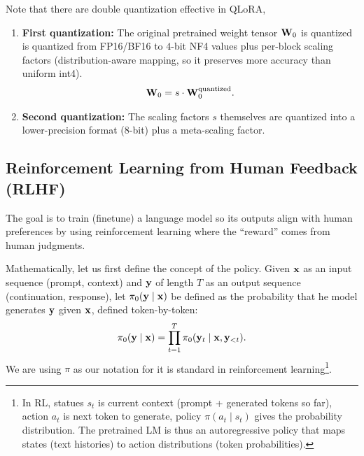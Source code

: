\documentclass[11pt]{article}  %
\begin{document}
Note that there are double quantization effective in QLoRA, 
\begin{enumerate}
  \item \textbf{First quantization:} The original pretrained weight tensor $\mathbf{W}_0$ is quantized is quantized from FP16/BF16 to $4$-bit NF4 values plus per-block scaling factors (distribution-aware mapping, so it preserves more accuracy than uniform int4).
  \begin{align*}
    \mathbf{W}_0 = s \cdot \mathbf{W}_0^{\text{quantized}}. 
  \end{align*}
  
  \item \textbf{Second quantization:} The scaling factors $s$ themselves are quantized into a lower-precision format (8-bit) plus a meta-scaling factor.
\end{enumerate}



\subsection{Reinforcement Learning from Human Feedback (RLHF)}
The goal is to train (finetune) a language model so its outputs align with human preferences by using reinforcement learning where the “reward” comes from human judgments.

Mathematically, let us first define the concept of the policy.
Given $\mathbf{x}$ as an input sequence (prompt, context) and $\mathbf{y}$ of length $T$ as an output sequence (continuation, response), let $\pi_0(\mathbf{y} \mid \mathbf{x})$ be defined as the probability that he model generates $\mathbf{y}$ given $\mathbf{x}$, defined token-by-token:
\begin{align*}
  \pi_0(\mathbf{y} \mid \mathbf{x}) = \prod_{t=1}^T \pi_0(\mathbf{y}_t \mid \mathbf{x}, \mathbf{y}_{<t}).
\end{align*}
We are using $\pi$ as our notation for it is standard in reinforcement learning\footnote{In RL, statues $s_t$ is current context (prompt + generated tokens so far), action $a_t$ is next token to generate, policy $\pi(a_t \mid s_t)$ gives the probability distribution. The pretrained LM is thus an autoregressive policy that maps states (text histories) to action distributions (token probabilities).}.
\end{document}
